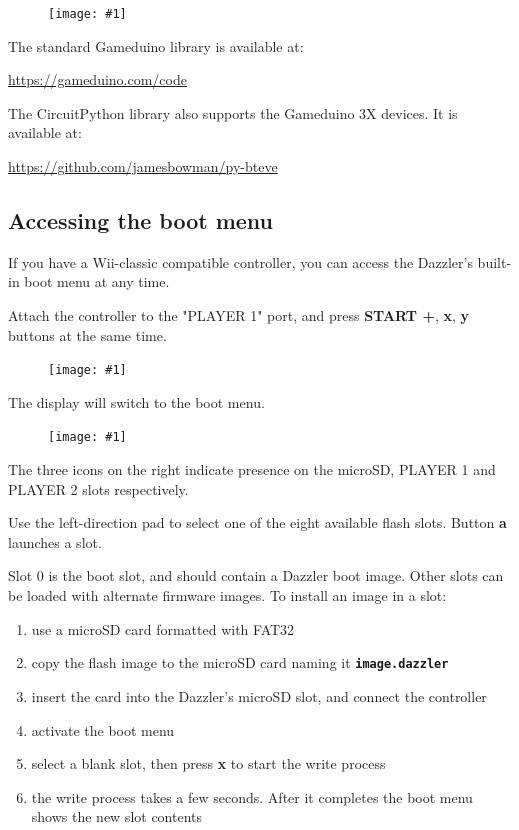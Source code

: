 \documentclass{article}
\newcommand{\pngw}[2]{
\begin{figure}[H]
\begin{center}
\texttt{[image: \#1]}
\end{center}
\end{figure}
}
\newcommand{\mach}[1]{\texttt{\textbf{#1}}}
\begin{document}
\pngw{img/gameduino-3x-dazzler/helloworld}{1.0}

The standard Gameduino library is available at:

\url{https://gameduino.com/code}

The CircuitPython library also supports the Gameduino 3X devices.
It is available at:

\url{https://github.com/jamesbowman/py-bteve}

\newpage
\subsection{Accessing the boot menu}\label{sec:bootmenu}

If you have a Wii-classic compatible controller,
you can access the Dazzler's built-in boot menu at any time.

Attach the controller to the "PLAYER 1" port, and press
\textbf{START +},
\textbf{x},
\textbf{y} buttons at the same time.

\pngw{img/gameduino-3x-dazzler/wii-bootmenu.png}{0.5}

The display will switch to the boot menu.

\pngw{img/gameduino-3x-dazzler/bootmenu1.png}{0.7}

The three icons on the right indicate presence on the
microSD, PLAYER 1 and PLAYER 2 slots respectively.

Use the left-direction pad to select one of the eight available flash slots.
Button \textbf{a} launches a slot.

Slot 0 is the boot slot, and should contain a Dazzler boot image. Other slots can be loaded with alternate firmware images.
To install an image in a slot: 
\begin{enumerate}

\item use a microSD card formatted with FAT32

\item copy the flash image to the microSD card naming it \mach{image.dazzler}

\item insert the card into the Dazzler's microSD slot, and connect the controller

\item activate the boot menu

\item select a blank slot, then press \textbf{x} to start the write process

\item the write process takes a few seconds.
After it completes the boot menu shows the new slot contents

\end{enumerate}
\end{document}
